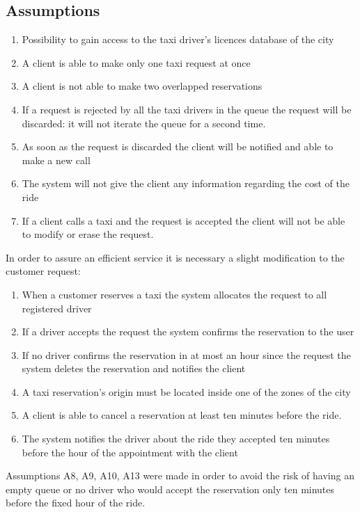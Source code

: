 \documentclass[a4paper]{article}
\begin{document}
\subsection{Assumptions}
\begin{enumerate}[label=\bfseries A\arabic*:]
\item Possibility to gain access to the taxi driver's licences database of the city
\item A client is able to make only one taxi request at once
\item A client is not able to make two overlapped reservations
\item If a request is rejected by all the taxi drivers in the queue the request will be discarded: it will not iterate the queue for a second time.
\item As soon as the request is discarded the client will be notified and able to make a new call
\item The system will not give the client any information regarding the cost of the ride
\item If a client calls a taxi and the request is accepted the client will not be able to modify or erase the request.
\end{enumerate}

In order to assure an efficient service it is necessary a slight modification to the customer request:

\begin{enumerate}[label=\bfseries A\arabic*:, resume]
\item When a customer reserves a taxi the system allocates the request to all registered driver
\item If a driver accepts the request the system confirms the reservation to the user
\item If no driver confirms the reservation in at most an hour since the request the system deletes the reservation and notifies the client
\item A taxi reservation's origin must be located inside one of the zones of the city
\item A client is able to cancel a reservation at least ten minutes before the ride.
\item The system notifies the driver about the ride they accepted ten minutes before the hour of the appointment with the client
\end{enumerate}

Assumptions A8, A9, A10, A13 were made in order to avoid the risk of having an empty queue or no driver who would accept the reservation only ten minutes before the fixed hour of the ride.
\end{document}
